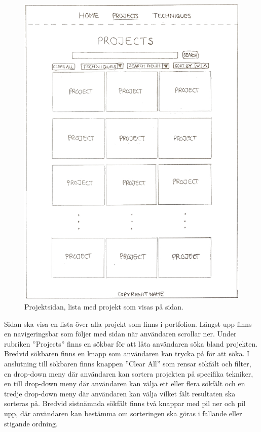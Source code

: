 \documentclass{TDP003mall}
\begin{document}
\begin{figure}[ht!]
  \centering
  \includegraphics[width=140mm]{3_projects.jpg}
  \caption{Projektsidan, lista med projekt som visas på sidan.} \label{fig3:Projects}
\end{figure}


\pagebreak
Sidan ska visa en lista över alla projekt som finns i portfolion. Längst upp finns en navigeringsbar som följer med sidan när användaren scrollar ner. Under rubriken ''Projects'' finns en sökbar för att låta användaren söka bland projekten. Bredvid sökbaren finns en knapp som användaren kan trycka på för att söka. I anslutning till sökbaren finns knappen ''Clear All'' som rensar sökfält och filter, en drop-down meny där användaren kan sortera projekten på specifika tekniker, en till drop-down meny där användaren kan välja ett eller flera sökfält och en tredje drop-down meny där användaren kan välja vilket fält resultaten ska sorteras på. Bredvid sistnämnda sökfält finns två knappar med pil ner och pil upp, där användaren kan bestämma om sorteringen ska göras i fallande eller stigande ordning.
\end{document}
